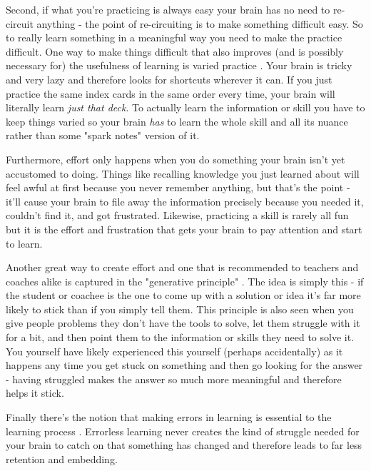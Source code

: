 \documentclass[11pt,a5paper]{book}
\begin{document}
Second, if what you're practicing is always easy your brain has no need to re-circuit anything - the point of re-circuiting is to make something difficult easy. So to really learn something in a meaningful way you need to make the practice difficult. One way to make things difficult that also improves (and is possibly necessary for) the usefulness of learning is varied practice \cite{stick} \cite{ericsson}. Your brain is tricky and very lazy and therefore looks for shortcuts wherever it can. If you just practice the same index cards in the same order every time, your brain will literally learn \textit{just that deck}. To actually learn the information or skill you have to keep things varied so your brain \textit{has} to learn the whole skill and all its nuance rather than some "spark notes" version of it.
\newline

Furthermore, effort only happens when you do something your brain isn't yet accustomed to doing. Things like recalling knowledge you just learned about will feel awful at first because you never remember anything, but that's the point - it'll cause your brain to file away the information precisely because you needed it, couldn't find it, and got frustrated. Likewise, practicing a skill is rarely all fun but it is the effort and frustration that gets your brain to pay attention and start to learn. 
\newline

Another great way to create effort and one that is recommended to teachers and coaches alike is captured in the "generative principle" \cite{stick} \cite{stanier} \cite{coactive}. The idea is simply this - if the student or coachee is the one to come up with a solution or idea it's far more likely to stick than if you simply tell them. This principle is also seen when you give people problems they don't have the tools to solve, let them struggle with it for a bit, and then point them to the information or skills they need to solve it. You yourself have likely experienced this yourself (perhaps accidentally) as it happens any time you get stuck on something and then go looking for the answer - having struggled makes the answer so much more meaningful and therefore helps it stick.
\newline

Finally there's the notion that making errors in learning is essential to the learning process \cite{stick}. Errorless learning never creates the kind of struggle needed for your brain to catch on that something has changed and therefore leads to far less retention and embedding.
\newline
\end{document}
